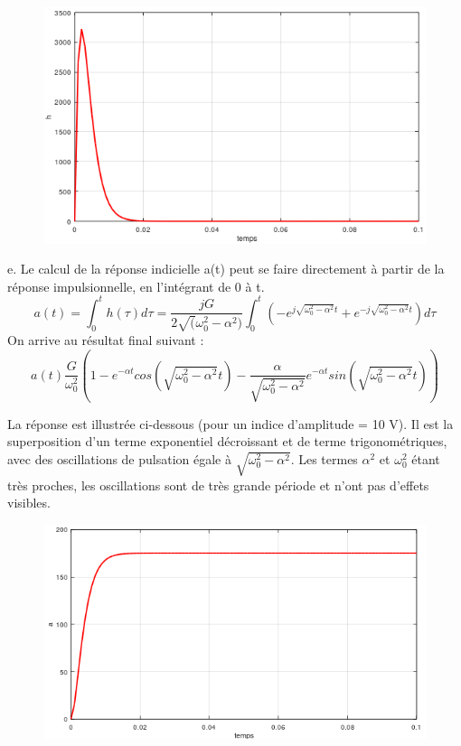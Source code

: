 \documentclass[11pt]{report}
\begin{document}
	\begin{figure}[h!]
		\centering
		\includegraphics[scale=0.7]{images/reponse_impuls_moteur.png} 
	\end{figure}
	
	
	e. Le calcul de la réponse indicielle a(t) peut se faire directement à partir de la réponse impulsionnelle, en l'intégrant de 0 à t.
	\begin{equation*}
	a(t)=\int_{0}^{t}h(\tau)d\tau=\frac{jG}{2\sqrt(\omega_{0}^2-\alpha^2)}\int_{0}^{t}(-e^{j\sqrt{\omega_{0}^2-\alpha^2}t}+e^{-j\sqrt{\omega_{0}^2-\alpha^2}t})d\tau
	\end{equation*}
	On arrive au résultat final suivant :
	\begin{equation*}
	a(t)\frac{G}{\omega_{0}^2}(1-e^{-\alpha t}cos(\sqrt{\omega_{0}^2-\alpha^2}t)-\frac{\alpha}{\sqrt{\omega_{0}^2-\alpha^2}}e^{-\alpha t}sin(\sqrt{\omega_{0}^2-\alpha^2}t))
	\end{equation*}
	
	La réponse est illustrée ci-dessous (pour un indice d'amplitude = 10 V). Il est la superposition d'un terme exponentiel décroissant et de terme trigonométriques, avec des oscillations de pulsation égale à $\sqrt{\omega_{0}^2-\alpha^2}$. Les termes $\alpha^2$ et $\omega_{0}^2$ étant très proches, les oscillations sont de très grande période et n'ont pas d'effets visibles.
	
	\begin{figure}[h!]
		\centering
		\includegraphics[scale=0.7]{images/reponse_indice_moteur.png} 
	\end{figure}
\end{document}
